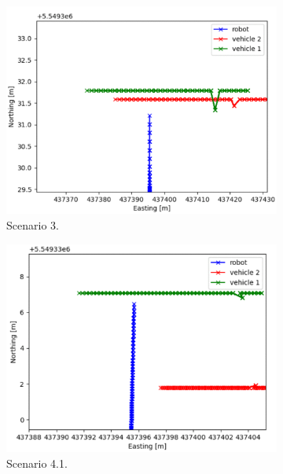 \begin{figure}[H]
\begin{subfigure}{0.49\linewidth}
                \centering
                \includegraphics[width=\linewidth]{images/simulations/closest_3.png}
                \caption{Scenario 3.}
            \end{subfigure}
            \begin{subfigure}{0.49\linewidth}
                \centering
                \includegraphics[width=\linewidth]{images/simulations/closest_4_1.png}
                \caption{Scenario 4.1.}
            \end{subfigure}
            \begin{subfigure}{0.49\linewidth}
                \centering

\end{subfigure}
\end{figure}
